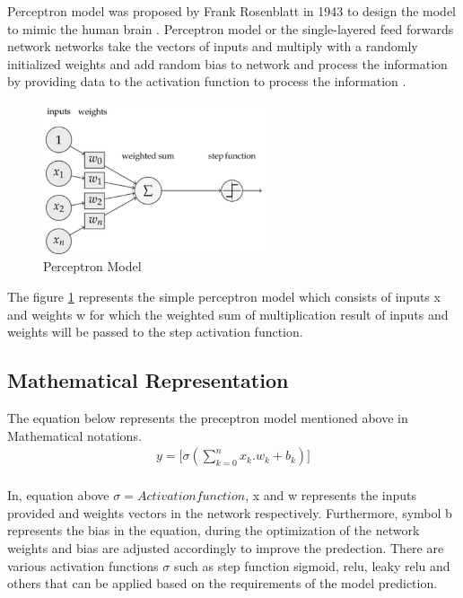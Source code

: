 Perceptron model was proposed by Frank Rosenblatt in 1943 to design the model to 
mimic the human brain \citep{939589}. Perceptron model or the single-layered feed forwards network 
networks take the vectors of inputs and multiply with a randomly 
initialized weights and add random bias to network and process the information by providing data to the
activation function to process the information \citep{AGATONOVICKUSTRIN2000717}.

\begin{figure}[!htp]
    \centering
    \includegraphics[width=0.6\textwidth]{Images/p_model.png} 
    \caption{Perceptron Model}
    \label{figure:perceptron}
\end{figure}
The figure \ref{figure:perceptron} represents the simple perceptron model which consists of inputs x and weights w 
for which the weighted sum of multiplication result of 
inputs and weights will be passed to the step activation function.

\subsection{Mathematical Representation }
\vspace{3mm}
{The equation below represents the preceptron model mentioned above in Mathematical notations.}
\begin{equation}
    \begin{split}
        y = \Big[\sigma(\sum_{k=0}^n x_k.w_k + b_k)\Big] \\
    \end{split}
\end{equation}

     {
        In, equation above ${\sigma = Activation function}$, x and w represents the inputs provided 
        and weights vectors in the network respectively. Furthermore, symbol b represents the bias in the equation, 
        during the optimization of the network weights and bias are adjusted accordingly to improve the predection. There are various activation functions ${\sigma}$ such as step function sigmoid, 
        relu, leaky relu and others that can be applied based on the requirements of the model prediction.
    }